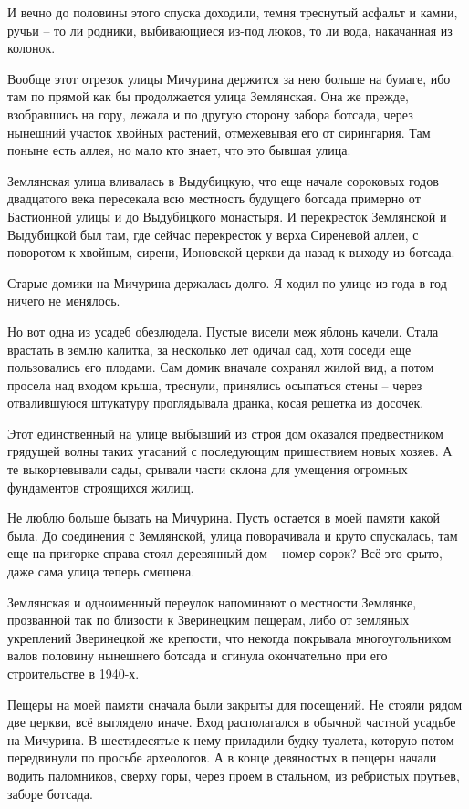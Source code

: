 И вечно до половины этого спуска доходили, темня треснутый асфальт и камни, ручьи – то ли родники, выбивающиеся из-под люков, то ли вода, накачанная из колонок.

Вообще этот отрезок улицы Мичурина держится за нею больше на бумаге, ибо там по прямой как бы продолжается улица Землянская. Она же прежде, взобравшись на гору, лежала и по другую сторону забора ботсада, через нынешний участок хвойных растений, отмежевывая его от сирингария. Там поныне есть аллея, но мало кто знает, что это бывшая улица.

Землянская улица вливалась в Выдубицкую, что еще начале сороковых годов двадцатого века пересекала всю местность будущего ботсада примерно от Бастионной улицы и до Выдубицкого монастыря. И перекресток Землянской и Выдубицкой был там, где сейчас перекресток у верха Сиреневой аллеи, с поворотом к хвойным, сирени, Ионовской церкви да назад к выходу из ботсада.

Старые домики на Мичурина держалась долго. Я ходил по улице из года в год – ничего не менялось.

Но вот одна из усадеб обезлюдела. Пустые висели меж яблонь качели. Стала врастать в землю калитка, за несколько лет одичал сад, хотя соседи еще пользовались его плодами. Сам домик вначале сохранял жилой вид, а потом просела над входом крыша, треснули, принялись осыпаться стены – через отвалившуюся штукатуру проглядывала дранка, косая решетка из досочек. 

Этот единственный на улице выбывший из строя дом оказался предвестником грядущей волны таких угасаний с последующим пришествием новых хозяев. А те выкорчевывали сады, срывали части склона для умещения огромных фундаментов строящихся жилищ.

Не люблю больше бывать на Мичурина. Пусть остается в моей памяти какой была. До соединения с Землянской, улица поворачивала и круто спускалась, там еще на пригорке справа стоял деревянный дом – номер сорок? Всё это срыто, даже сама улица теперь смещена.

Землянская и одноименный переулок напоминают о местности Землянке, прозванной так по близости к Зверинецким пещерам, либо от земляных укреплений Зверинецкой же крепости, что некогда покрывала многоугольником валов половину нынешнего ботсада и сгинула окончательно при его строительстве в 1940-х.

Пещеры на моей памяти сначала были закрыты для посещений. Не стояли рядом две церкви, всё выглядело иначе. Вход располагался в обычной частной усадьбе на Мичурина. В шестидесятые к нему приладили будку туалета, которую потом передвинули по просьбе археологов. А в конце девяностых в пещеры начали водить паломников, сверху горы, через проем в стальном, из ребристых прутьев, заборе ботсада.


